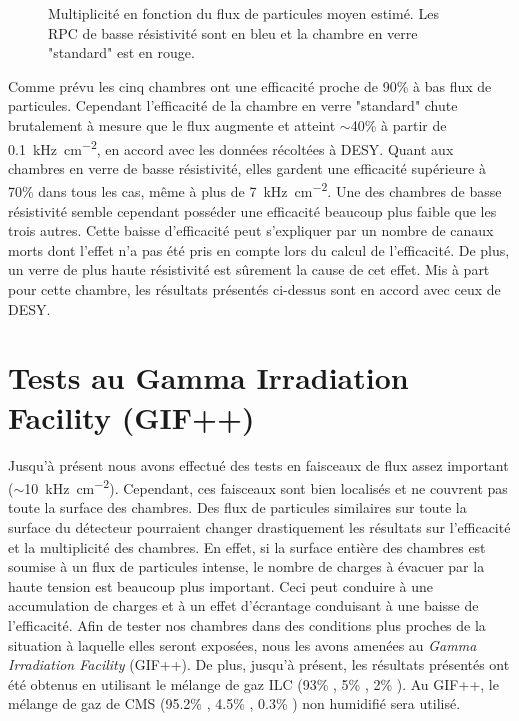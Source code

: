 \begin{figure}[!ht]
	\centering
	\caption{Multiplicité en fonction du flux de particules moyen estimé. Les RPC de basse résistivité sont en bleu et la chambre en verre "standard" est en rouge.}
	\label{MultiplictySPS}
\end{figure}
\vspace*{-0.2cm}
Comme prévu les cinq chambres ont une efficacité proche de \num{90}\% à bas flux de particules. Cependant l'efficacité de  la chambre en verre "standard" chute brutalement à mesure que le flux augmente et atteint $\sim $40\% à partir de \SI{0.1}{\kilo\hertz\per\square\centi\meter}, en accord avec les données récoltées à DESY. Quant aux chambres en verre de basse résistivité, elles gardent une efficacité supérieure à 70\% dans tous les cas, même à plus de \SI{7}{\kilo\hertz\per\square\centi\meter}. Une des chambres de basse résistivité semble cependant posséder une efficacité beaucoup plus faible que les trois autres. Cette baisse d'efficacité peut s'expliquer par un nombre de canaux morts dont l'effet n'a pas été pris en compte lors du calcul de l'efficacité. De plus, un verre de plus haute résistivité est sûrement la cause de cet effet. Mis à part pour cette chambre, les résultats présentés ci-dessus sont en accord avec ceux de DESY.

\section{Tests au Gamma Irradiation Facility (GIF++)}
\vspace*{-0.2cm}
Jusqu'à présent nous avons effectué des tests en faisceaux de flux assez important ($\sim$\SI{10}{\kilo\hertz\per\square\centi\meter}). Cependant, ces faisceaux sont bien localisés et ne couvrent pas toute la surface des chambres. Des flux de particules similaires sur toute la surface du détecteur pourraient changer drastiquement les résultats sur l'efficacité et la multiplicité des chambres. En effet, si la surface entière des chambres est soumise à un flux de particules intense, le nombre de charges à évacuer par la haute tension est beaucoup plus important. Ceci peut conduire à une accumulation de charges et à un effet d'écrantage conduisant à une baisse de l'efficacité. Afin de tester nos chambres dans des conditions plus proches de la situation à laquelle elles seront exposées, nous les avons amenées au \textit{Gamma Irradiation Facility} (GIF++). De plus, jusqu'à présent, les résultats présentés ont été obtenus en utilisant le mélange de gaz ILC (\num{93}\% , \num{5}\% , \num{2}\% ). Au GIF++, le mélange de gaz de CMS (\num{95.2}\% , \num{4.5}\% , \num{0.3}\% ) non humidifié sera utilisé.


